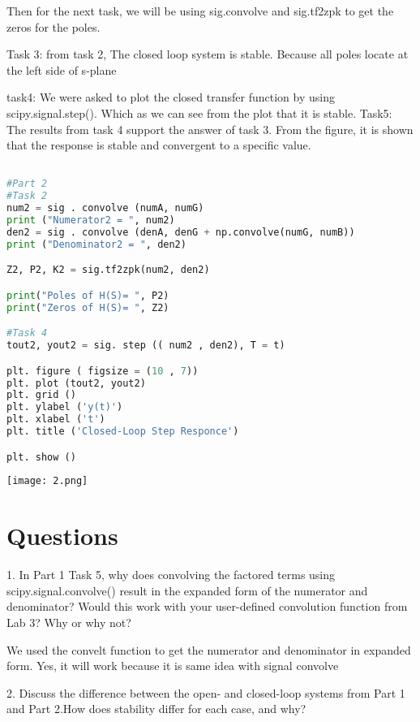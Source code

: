 \documentclass[12pt]{report}
\begin{document}
Then for the next task, we will be using sig.convolve and sig.tf2zpk to get the zeros for the poles. 

Task 3:  from task 2, The closed loop system is stable. Because all poles locate at the left side of s-plane

task4: We were asked to plot the closed transfer function by using scipy.signal.step(). Which as we can see from the plot that it is stable.
Task5: The results from task 4 support the answer of task 3. From the figure, it is shown that the response is stable and convergent to a specific value.

\begin{lstlisting}[language=Python]

#Part 2
#Task 2
num2 = sig . convolve (numA, numG)
print ("Numerator2 = ", num2)
den2 = sig . convolve (denA, denG + np.convolve(numG, numB))
print ("Denominator2 = ", den2)

Z2, P2, K2 = sig.tf2zpk(num2, den2)

print("Poles of H(S)= ", P2)
print("Zeros of H(S)= ", Z2)

#Task 4
tout2, yout2 = sig. step (( num2 , den2), T = t)

plt. figure ( figsize = (10 , 7))
plt. plot (tout2, yout2)
plt. grid ()
plt. ylabel ('y(t)')
plt. xlabel ('t')
plt. title ('Closed-Loop Step Responce')

plt. show ()

\end{lstlisting}

\texttt{[image: 2.png]}





\section{Questions}

1. In Part 1 Task 5, why does convolving the factored terms using scipy.signal.convolve()
result in the expanded form of the numerator and denominator? Would this work with your
user-defined convolution function from Lab 3? Why or why not?

We used the convelt function to get the numerator and denominator in expanded form.  Yes, it will work because it is same idea with signal convolve

2. Discuss the difference between the open- and closed-loop systems from Part 1 and Part 2.How does stability differ for each case, and why?
\end{document}
